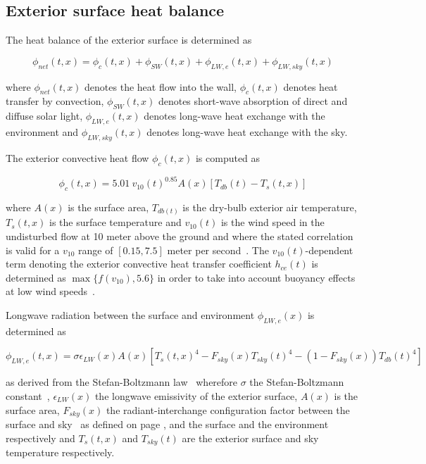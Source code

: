 \subsection{Exterior surface heat balance}

The heat balance of the exterior surface is determined as 

\begin{equation}
\phi_{net}(t,x) = \phi_{c}(t,x) + \phi_{SW}(t,x) + \phi_{LW,e}(t,x) + \phi_{LW,sky}(t,x)
\end{equation}

where $\phi_{net}(t,x)$ denotes the heat flow into the wall, $\phi_{c}(t,x)$ denotes heat transfer by convection, $\phi_{SW}(t,x)$ denotes short-wave absorption of direct and diffuse solar light, $\phi_{LW,e}(t,x)$ denotes long-wave heat exchange with the environment and $\phi_{LW,sky}(t,x)$ denotes long-wave heat exchange with the sky.

 The exterior convective heat flow $\phi_{c}(t,x)$ is computed as

\begin{equation}
\phi_{c}(t,x) = 5.01\ v_{10}(t)^{0.85} A(x) \left[T_{db}(t) - T_{s}(t,x)\right]
\end{equation}

where $A(x)$ is the surface area, $T_{db(t)}$ is the dry-bulb exterior air temperature, $T_{s}(t,x)$ is the surface temperature and $v_{10}(t)$ is the wind speed in the undisturbed flow at 10 meter above the ground and where the stated correlation is valid for a $v_{10}$ range of $\left[0.15,7.5\right]$ meter per second~\cite{Defraeye2011}. The $v_{10}(t)$-dependent term denoting the exterior convective heat transfer coefficient $h_{ce}(t)$ is determined as $\max\{f(v_{10}),5.6\}$ in order to take into account buoyancy effects at low wind speeds~\cite{Jurges1924}.

 Longwave radiation between the surface and environment $\phi_{LW,e}(x)$ is determined as 

\begin{equation}
\phi_{LW,e}(t,x)=\sigma \epsilon_{LW}(x) A(x)  \left[T_{s}(t,x)^{4} - F_{sky}(x)T_{sky}(t)^{4} - (1-F_{sky}(x))T_{db}(t)^{4}\right]
\end{equation}

as derived from the Stefan-Boltzmann law~\cite{Stefan1879,Boltzmann1884} wherefore $\sigma$ the Stefan-Boltzmann constant~\cite{Mohr2008}, $\epsilon_{LW}(x)$ the longwave emissivity of the exterior surface, $A(x)$ is the surface area, $F_{sky}(x)$ the radiant-interchange configuration factor between the surface and sky~\cite{Hamilton1952} as defined on page \pageref{chap:climsol}, and the surface and the environment respectively and $T_{s}(t,x)$ and $T_{sky}(t)$ are the exterior surface and sky temperature respectively.

